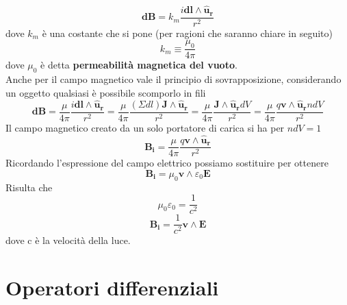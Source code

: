 \documentclass[10pt,a4paper]{article}
\begin{document}
\[\mathbf{dB}=k_m\frac{i\mathbf{dl}\wedge\mathbf{\hat{u}_r}}{r^2}\]
dove \(k_m\) è una costante che si pone (per ragioni che saranno chiare in seguito)
\[k_m \equiv\frac{\mu_0}{4\pi}\]
dove $\mu_0$ è detta \textbf{permeabilità magnetica del vuoto}.\\
Anche per il campo magnetico vale il principio di sovrapposizione, considerando un oggetto qualsiasi è possibile scomporlo in fili
\[\mathbf{dB}=\frac{\mu}{4\pi}\frac{i\mathbf{dl}\wedge\mathbf{\hat{u}_r}}{r^2}=\frac{\mu}{4\pi}\frac{(\Sigma dl)\mathbf{J}\wedge\mathbf{\hat{u}_r}}{r^2}=\frac{\mu}{4\pi}\frac{\mathbf{J}\wedge\mathbf{\hat{u}_r}dV}{r^2}=\frac{\mu}{4\pi}\frac{q\mathbf{v}\wedge\mathbf{\hat{u}_r}n dV}{r^2}\]
Il campo magnetico creato da un solo portatore di carica si ha per \(ndV=1\)
\[\mathbf{B_i}=\frac{\mu}{4\pi}\frac{q\mathbf{v}\wedge\mathbf{\hat{u}_r}}{r^2}\] 
Ricordando l'espressione del campo elettrico possiamo sostituire per ottenere
\[\mathbf{B_i}=\mu_0\mathbf{v}\wedge\varepsilon_0\mathbf{E}\]
Risulta che 
\[\mu_0\varepsilon_0=\frac{1}{c^2}\]
\[\mathbf{B_i}=\frac{1}{c^2}\mathbf{v}\wedge\mathbf{E}\]
dove c è la velocità della luce.
\appendix
\section{Operatori differenziali}
\end{document}
